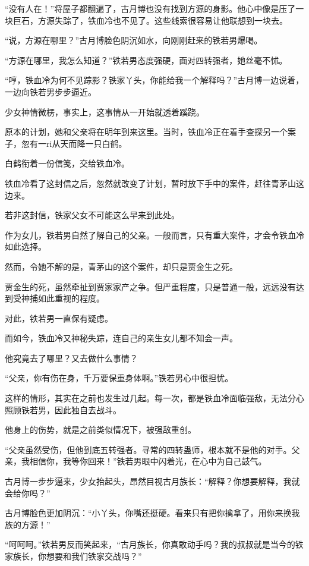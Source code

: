 
\begin{this_body}

“没有人在！”将屋子都翻遍了，古月博也没有找到方源的身影。他心中像是压了一块巨石，方源失踪了，铁血冷也不见了。这些线索很容易让他联想到一块去。

“说，方源在哪里？”古月博脸色阴沉如水，向刚刚赶来的铁若男爆喝。

“方源在哪里，我怎么知道？”铁若男态度强硬，面对四转强者，她丝毫不怵。

“哼，铁血冷为何不见踪影？铁家丫头，你能给我一个解释吗？”古月博一边说着，一边向铁若男步步逼近。

少女神情微楞，事实上，这事情从一开始就透着蹊跷。

原本的计划，她和父亲将在明年到来这里。当时，铁血冷正在着手查探另一个案子，忽有一ri从天而降一只白鹤。

白鹤衔着一份信笺，交给铁血冷。

铁血冷看了这封信之后，忽然就改变了计划，暂时放下手中的案件，赶往青茅山这边来。

若非这封信，铁家父女不可能这么早来到此处。

作为女儿，铁若男自然了解自己的父亲。一般而言，只有重大案件，才会令铁血冷如此选择。

然而，令她不解的是，青茅山的这个案件，却只是贾金生之死。

贾金生的死，虽然牵扯到贾家家产之争。但严重程度，只是普通一般，远远没有达到受神捕如此重视的程度。

对此，铁若男一直保有疑虑。

而如今，铁血冷又神秘失踪，连自己的亲生女儿都不知会一声。

他究竟去了哪里？又去做什么事情？

“父亲，你有伤在身，千万要保重身体啊。”铁若男心中很担忧。

这样的情形，其实在之前也发生过几起。每一次，都是铁血冷面临强敌，无法分心照顾铁若男，因此独自去战斗。

他身上的伤势，就是之前类似情况下，被强敌重创。

“父亲虽然受伤，但他到底五转强者。寻常的四转蛊师，根本就不是他的对手。父亲，我相信你，我等你回来！”铁若男眼中闪着光，在心中为自己鼓气。

古月博一步步逼来，少女抬起头，昂然目视古月族长：“解释？你想要解释，我就会给你吗？”

古月博脸色更加阴沉：“小丫头，你嘴还挺硬。看来只有把你擒拿了，用你来换我族的方源！”

“呵呵呵。”铁若男反而笑起来，“古月族长，你真敢动手吗？我的叔叔就是当今的铁家族长，你想要和我们铁家交战吗？”


\end{this_body}
